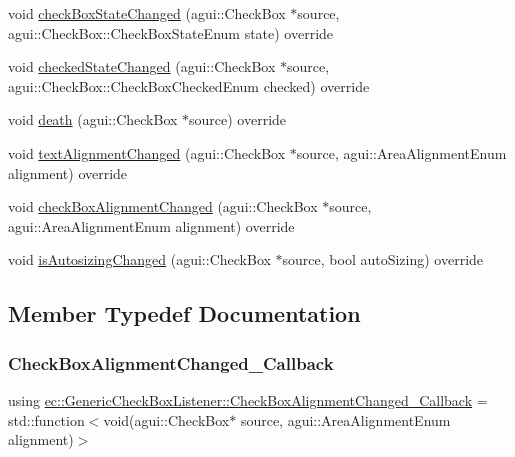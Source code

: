 \begin{DoxyCompactItemize}
\item 
void \mbox{\hyperlink{classec_1_1_generic_check_box_listener_ae21003432ad938518b2f399e02689a5b}{check\+Box\+State\+Changed}} (agui\+::\+Check\+Box $\ast$source, agui\+::\+Check\+Box\+::\+Check\+Box\+State\+Enum state) override
\item 
void \mbox{\hyperlink{classec_1_1_generic_check_box_listener_a861ff5c1597ab9ef90ec051b2ddc90a1}{checked\+State\+Changed}} (agui\+::\+Check\+Box $\ast$source, agui\+::\+Check\+Box\+::\+Check\+Box\+Checked\+Enum checked) override
\item 
void \mbox{\hyperlink{classec_1_1_generic_check_box_listener_af002391270c8aa8cbc1cc8a04d6a3b19}{death}} (agui\+::\+Check\+Box $\ast$source) override
\item 
void \mbox{\hyperlink{classec_1_1_generic_check_box_listener_abe00afb238e730d9e88c14e540f209ca}{text\+Alignment\+Changed}} (agui\+::\+Check\+Box $\ast$source, agui\+::\+Area\+Alignment\+Enum alignment) override
\item 
void \mbox{\hyperlink{classec_1_1_generic_check_box_listener_a231cf0b48aa2dd71f9781993e90817ff}{check\+Box\+Alignment\+Changed}} (agui\+::\+Check\+Box $\ast$source, agui\+::\+Area\+Alignment\+Enum alignment) override
\item 
void \mbox{\hyperlink{classec_1_1_generic_check_box_listener_a94be6628b6da23836531acaf4c3eecbc}{is\+Autosizing\+Changed}} (agui\+::\+Check\+Box $\ast$source, bool auto\+Sizing) override
\end{DoxyCompactItemize}


\subsection{Member Typedef Documentation}
\mbox{\label{classec_1_1_generic_check_box_listener_a9b20541580dce7b3a1818b62524d2c6a}} 
\subsubsection{\texorpdfstring{Check\+Box\+Alignment\+Changed\+\_\+\+Callback}{CheckBoxAlignmentChanged\_Callback}}
{\footnotesize\ttfamily using \mbox{\hyperlink{classec_1_1_generic_check_box_listener_a9b20541580dce7b3a1818b62524d2c6a}{ec\+::\+Generic\+Check\+Box\+Listener\+::\+Check\+Box\+Alignment\+Changed\+\_\+\+Callback}} =  std\+::function$<$void(agui\+::\+Check\+Box$\ast$ source, agui\+::\+Area\+Alignment\+Enum alignment)$>$}

